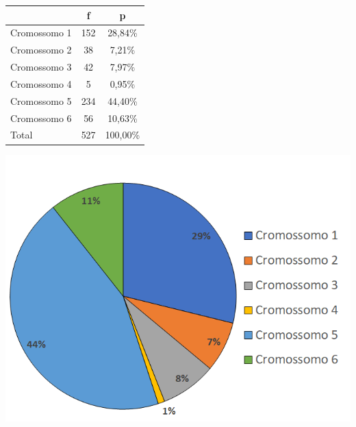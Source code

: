 \begin{description}
\begin{table}[htb]
	\begin{minipage}[b]{.49\textwidth}
	\centering
			\begin{tabular}{l|c|c}
				& f   & p        \\ \hline
				Cromossomo 1 & 152 & 28,84\%  \\
				Cromossomo 2 & 38  & 7,21\%  \\
				Cromossomo 3 & 42  & 7,97\%  \\
				Cromossomo 4 & 5   & 0,95\%   \\
				Cromossomo 5 & 234 & 44,40\%   \\
				Cromossomo 6 & 56  & 10,63\%   \\ \hline
				Total        & 527 & 100,00\%
			\end{tabular}
			\label{tab:exemplo_roleta}
	\end{minipage}
	\begin{minipage}[b]{.49\textwidth}
	\centering
			\includegraphics[width=\linewidth]{imagens/exemplo_roleta.png}
			\label{fig:exemplo_roleta}
	\end{minipage}
\end{table}


\end{description}
